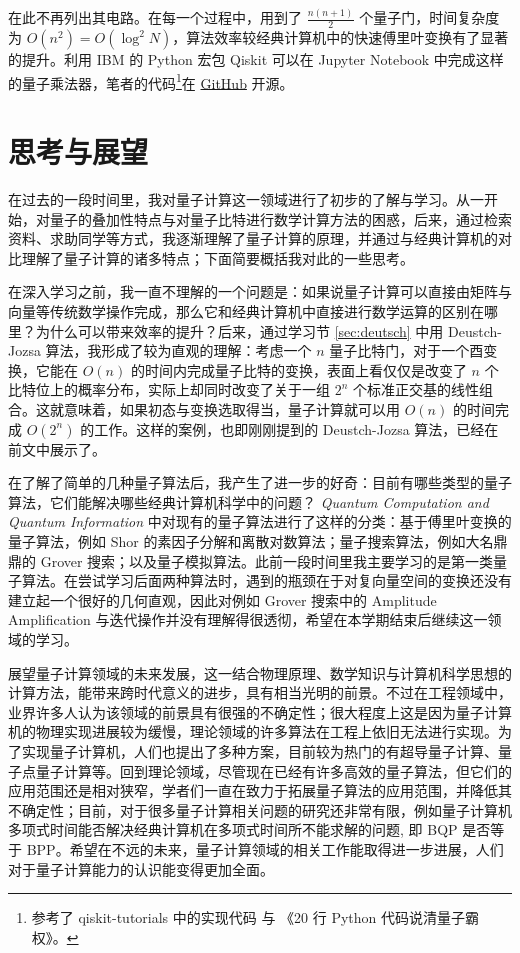 \documentclass[a4paper,11pt,onecolumn,twoside]{article}
\begin{document}
在此不再列出其电路。在每一个过程中，用到了 $\frac{n(n+1)}{2}$ 个量子门，时间复杂度为 $O(n^2)=O(\log^2 N)$，算法效率较经典计算机中的快速傅里叶变换有了显著的提升。利用 IBM 的 Python 宏包 Qiskit 可以在 Jupyter Notebook 中完成这样的量子乘法器，笔者的代码\footnote{参考了 qiskit-tutorials 中的实现代码\cite{Qiskit} 与 《20 行 Python 代码说清量子霸权》。}在 \href{https://github.com/Conless/quantum-computing-intro/blob/main/src/qft.ipynb}{GitHub} 开源。

\section{思考与展望}

在过去的一段时间里，我对量子计算这一领域进行了初步的了解与学习。从一开始，对量子的叠加性特点与对量子比特进行数学计算方法的困惑，后来，通过检索资料、求助同学等方式，我逐渐理解了量子计算的原理，并通过与经典计算机的对比理解了量子计算的诸多特点；下面简要概括我对此的一些思考。

在深入学习之前，我一直不理解的一个问题是：如果说量子计算可以直接由矩阵与向量等传统数学操作完成，那么它和经典计算机中直接进行数学运算的区别在哪里？为什么可以带来效率的提升？后来，通过学习节 \ref{sec:deutsch} 中用 Deustch-Jozsa 算法，我形成了较为直观的理解：考虑一个 $n$ 量子比特门，对于一个酉变换，它能在 $O(n)$ 的时间内完成量子比特的变换，表面上看仅仅是改变了 $n$ 个比特位上的概率分布，实际上却同时改变了关于一组 $2^n$ 个标准正交基的线性组合。这就意味着，如果初态与变换选取得当，量子计算就可以用 $O(n)$ 的时间完成 $O(2^n)$ 的工作。这样的案例，也即刚刚提到的 Deustch-Jozsa 算法，已经在前文中展示了。

在了解了简单的几种量子算法后，我产生了进一步的好奇：目前有哪些类型的量子算法，它们能解决哪些经典计算机科学中的问题？\textit{ Quantum Computation and Quantum Information}\cite{nielsen2002quantum} 中对现有的量子算法进行了这样的分类：基于傅里叶变换的量子算法，例如 Shor 的素因子分解和离散对数算法；量子搜索算法，例如大名鼎鼎的 Grover 搜索；以及量子模拟算法。此前一段时间里我主要学习的是第一类量子算法。在尝试学习后面两种算法时，遇到的瓶颈在于对复向量空间的变换还没有建立起一个很好的几何直观，因此对例如 Grover 搜索中的 Amplitude Amplification 与迭代操作并没有理解得很透彻，希望在本学期结束后继续这一领域的学习。

展望量子计算领域的未来发展，这一结合物理原理、数学知识与计算机科学思想的计算方法，能带来跨时代意义的进步，具有相当光明的前景。不过在工程领域中，业界许多人认为该领域的前景具有很强的不确定性；很大程度上这是因为量子计算机的物理实现进展较为缓慢，理论领域的许多算法在工程上依旧无法进行实现。为了实现量子计算机，人们也提出了多种方案，目前较为热门的有超导量子计算、量子点量子计算等。回到理论领域，尽管现在已经有许多高效的量子算法，但它们的应用范围还是相对狭窄，学者们一直在致力于拓展量子算法的应用范围，并降低其不确定性；目前，对于很多量子计算相关问题的研究还非常有限\cite{孙晓明2016量子计算若干前沿问题综述}，例如量子计算机多项式时间能否解决经典计算机在多项式时间所不能求解的问题, 即 BQP 是否等于 BPP。希望在不远的未来，量子计算领域的相关工作能取得进一步进展，人们对于量子计算能力的认识能变得更加全面。
\end{document}
